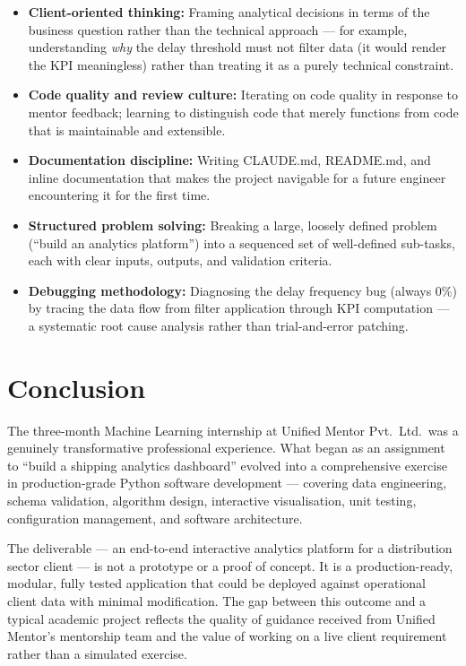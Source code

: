 \documentclass[12pt, a4paper]{report}
\begin{document}
\begin{itemize}[leftmargin=1.5em, itemsep=6pt]
  \item \textbf{Client-oriented thinking:} Framing analytical decisions
    in terms of the business question rather than the technical approach —
    for example, understanding \emph{why} the delay threshold must not
    filter data (it would render the KPI meaningless) rather than treating
    it as a purely technical constraint.
  \item \textbf{Code quality and review culture:} Iterating on code quality
    in response to mentor feedback; learning to distinguish code that
    merely functions from code that is maintainable and extensible.
  \item \textbf{Documentation discipline:} Writing CLAUDE.md, README.md,
    and inline documentation that makes the project navigable for a future
    engineer encountering it for the first time.
  \item \textbf{Structured problem solving:} Breaking a large, loosely
    defined problem (``build an analytics platform'') into a sequenced
    set of well-defined sub-tasks, each with clear inputs, outputs, and
    validation criteria.
  \item \textbf{Debugging methodology:} Diagnosing the delay frequency bug
    (always 0\%) by tracing the data flow from filter application through
    KPI computation — a systematic root cause analysis rather than
    trial-and-error patching.
\end{itemize}

\chapter{Conclusion}

The three-month Machine Learning internship at Unified Mentor Pvt.\ Ltd.\
was a genuinely transformative professional experience. What began as an
assignment to ``build a shipping analytics dashboard'' evolved into a
comprehensive exercise in production-grade Python software development —
covering data engineering, schema validation, algorithm design, interactive
visualisation, unit testing, configuration management, and software
architecture.

The deliverable — an end-to-end interactive analytics platform for a
distribution sector client — is not a prototype or a proof of concept.
It is a production-ready, modular, fully tested application that could
be deployed against operational client data with minimal modification.
The gap between this outcome and a typical academic project reflects the
quality of guidance received from Unified Mentor's mentorship team and
the value of working on a live client requirement rather than a
simulated exercise.
\end{document}
